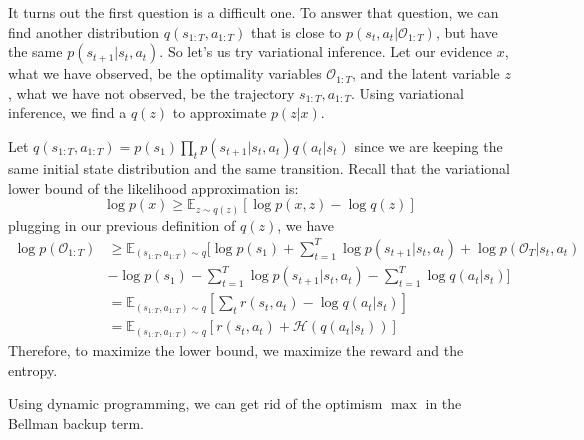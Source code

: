 It turns out the first question is a difficult one. To answer that question, we can find another distribution $q(s_{1:T},a_{1:T})$ that is close to $p(s_t,a_t|\mathcal{O}_{1:T})$, but have the same $p(s_{t+1}|s_t,a_t)$. So let's us try variational inference. Let our evidence $x$, what we have observed, be the optimality variables $\mathcal{O}_{1:T}$, and the latent variable $z$, what we have not observed, be the trajectory $s_{1:T},a_{1:T}$. Using variational inference, we find a $q(z)$ to approximate $p(z|x)$.

Let $q(s_{1:T},a_{1:T}) = p(s_1)\prod_t p(s_{t+1}|s_t,a_t)q(a_t|s_t)$ since we are keeping the same initial state distribution and the same transition. Recall that the variational lower bound of the likelihood approximation is:
\[
\log p(x)\geq \mathbb{E}_{z\sim q(z)}[\log p(x,z) - \log q(z)]
\]
plugging in our previous definition of $q(z)$, we have
\begin{align*}
    \log p(\mathcal{O}_{1:T}) &\geq \mathbb{E}_{(s_{1:T},a_{1:T})\sim q}\bigg[ \log p(s_1) + \sum_{t=1}^T \log p(s_{t+1}|s_t,a_t) + \log p(\mathcal{O}_{T}|s_t,a_t)\\ &- \log p(s_1) - \sum_{t=1}^T \log p(s_{t+1}|s_t,a_t) - \sum_{t=1}^T\log q(a_t|s_t) \bigg]\\
    &= \mathbb{E}_{(s_{1:T},a_{1:T})\sim q}\left[\sum_t r(s_t,a_t) - \log q(a_t|s_t)\right]\\
    &= \mathbb{E}_{(s_{1:T},a_{1:T})\sim q}\left[r(s_t,a_t)+\mathcal{H}(q(a_t|s_t))\right]
\end{align*}
Therefore, to maximize the lower bound, we maximize the reward and the entropy.

Using dynamic programming, we can get rid of the optimism $\max$ in the Bellman backup term.